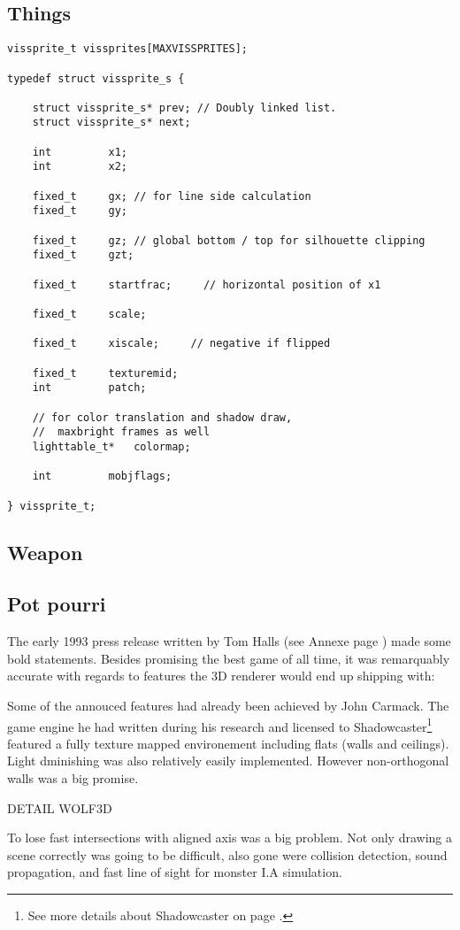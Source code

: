 \subsection{Things}
\begin{verbatim}
vissprite_t	vissprites[MAXVISSPRITES];

typedef struct vissprite_s {
    
    struct vissprite_s*	prev; // Doubly linked list.
    struct vissprite_s*	next;
    
    int			x1;
    int			x2;
    
    fixed_t		gx; // for line side calculation
    fixed_t		gy;		

    fixed_t		gz; // global bottom / top for silhouette clipping
    fixed_t		gzt;

    fixed_t		startfrac;     // horizontal position of x1
    
    fixed_t		scale;
        
    fixed_t		xiscale;	 // negative if flipped

    fixed_t		texturemid;
    int			patch;

    // for color translation and shadow draw,
    //  maxbright frames as well
    lighttable_t*	colormap;
   
    int			mobjflags;
    
} vissprite_t;

\end{verbatim}
\subsection{Weapon}

\subsection{Pot pourri}
The early 1993 press release written by Tom Halls (see Annexe page \pageref{label_press_release}) made some bold statements. Besides promising the best game of all time, it was remarquably accurate with regards to features the 3D renderer would end up shipping with:\\
\par
\par
Some of the annouced features had already been achieved by John Carmack. The game engine he had written during his research and licensed to Shadowcaster\footnote{See more details about Shadowcaster on page \pageref{label_shadowcaster}.} featured a fully texture mapped environement including flats (walls and ceilings). Light dminishing was also relatively easily implemented. However non-orthogonal walls was a big promise.\\
\par
DETAIL WOLF3D\\
\par
To lose fast intersections with aligned axis was a big problem. Not only drawing a scene correctly was going to be difficult, also gone were collision detection, sound propagation, and fast line of sight for monster I.A simulation.\\
\par
